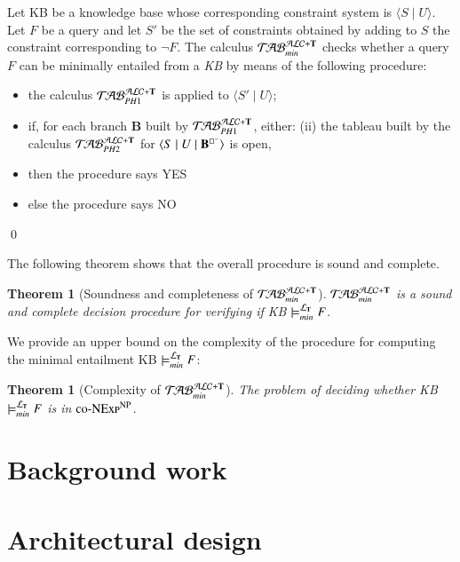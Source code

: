 \documentclass[a4paper, 11pt, oneside]{elsarticle}
\newcommand{\tip}{{\bf T}}
\newcommand{\nott} {\lnot}
\newcommand{\tc} {\mid}
\newcommand{\bbox}{\square}
\newcommand{\sx} {\langle}
\newcommand{\dx} {\rangle}
\newcommand{\ellet} {\mathcal{L}_{\bf T}}
\newcommand{\nuovoc}{\mathrel{{\mathcal{T}\!\mathcal{AB}}}_{min}^{\mathcal{ALC}+\mbox{\scriptsize $\tip$}}}
\newcommand{\primo}{\mathrel{{\mathcal{T}\!\mathcal{AB}}}_{PH 1}^{\mathcal{ALC}+\mbox{\scriptsize $\tip$}}}
\newcommand{\secondo}{\mathrel{{\mathcal{T}\!\mathcal{AB}}}_{PH 2}^{\mathcal{ALC}+\mbox{\scriptsize $\tip$}}}
\newenvironment{definition}
{\begin{defi} \rm}{\qed \end{defi}}
\newtheorem{theorem}{Theorem}
\newcounter{posu}
\newtheorem{theorem}[posu]{Theorem}
\newtheorem{definition}[posu]{Definition}
\begin{document}
\begin{definition}\label{def processo}
Let KB be a knowledge base whose corresponding constraint system is $\sx S \tc U \dx$. Let $F$ be a query and let $S'$ be the set of
constraints obtained by adding to $S$ the constraint corresponding to $\nott F$.
The calculus $\nuovoc$ checks whether a query $F$ can be minimally entailed from a \emph{KB} by means of the following procedure:
\begin{itemize}
\item the calculus $\primo$ is applied to $\sx S' \tc U
\dx$;  \item if, for each branch {\bf B} built by $\primo$,
either:  \subitem(ii) {the
tableau built by the calculus $\secondo$ for $\sx S \tc U \tc {\bf
B}^{\bbox^{-}} \dx$ is open, } \item[] then the procedure says \textsc{YES}
\item[] else the procedure says \textsc{NO}
\end{itemize}
\end{definition}

\noindent The following theorem shows that the overall procedure is sound
and complete.


\begin{theorem}[Soundness and completeness of $\nuovoc$]\label{Soundness e completeness nuovoc}
$\nuovoc$ is  a sound and complete decision procedure for
verifying if KB $\models_{min}^{\ellet} F$.
\end{theorem}

We provide an upper bound on the complexity of the
procedure for computing the minimal entailment KB
$\models_{min}^{\ellet} F$:

\begin{theorem}[Complexity of $\nuovoc$]\label{overall_complexity}
The problem of deciding whether \emph{KB} $\models_{min}^{\ellet} F$ is
in $\textsc{co-NExp}^\textsc{NP}$.
\end{theorem}




\section{Background work}


\section{Architectural design}
\end{document}
